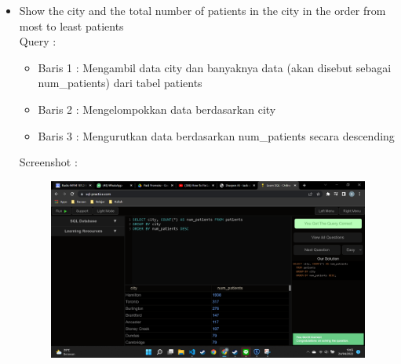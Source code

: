 \documentclass[]{article}
\begin{document}
\begin{itemize}
        \item Show the city and the total number of patients in the city in the order from most to least patients
        \\Query :
        
        \begin{itemize}
            \item Baris 1 : Mengambil data city dan banyaknya data (akan disebut sebagai num\_patients) dari tabel patients
            \item Baris 2 : Mengelompokkan data berdasarkan city
            \item Baris 3 : Mengurutkan data berdasarkan num\_patients secara descending
        \end{itemize}
        \pagebreak
        Screenshot :
        \begin{figure}[h]
            \includegraphics[scale=0.3]{./Screenshot/Medium-9.png}
            \centering
        \end{figure}


\end{itemize}
\end{document}
